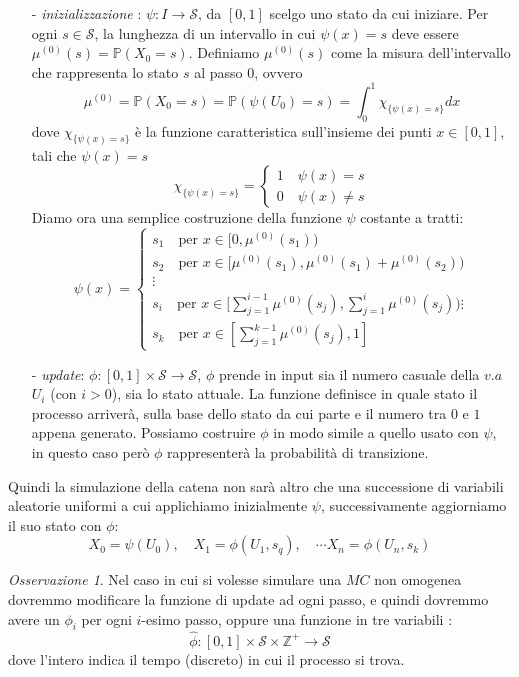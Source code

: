 \documentclass{article}
\theoremstyle{definition}
\theoremstyle{definition}
\theoremstyle{remark}
\newtheorem{remark}[theorem]{Osservazione}
\begin{document}
\begin{itemize}
    \item[-] \textit{inizializzazione} : $\psi : I\to \mathcal{S}$, da $[0,1]$ scelgo uno stato da cui iniziare.
          Per ogni $s\in\mathcal{S}$, la lunghezza di un intervallo in cui $\psi(x)=s$ deve essere $\mu^{(0)}(s) =\mathbb{P}(X_0 = s) $.
          Definiamo $\mu^{(0)}(s)$ come la misura dell'intervallo che rappresenta lo stato $s$ al passo $0$, ovvero
          $$ \mu^{(0)} = \mathbb{P}(X_0 = s) = \mathbb{P}(\psi(U_0)=s) = \int_0^1 \chi_{\{\psi(x)=s\}} dx$$
          dove $\chi_{\{\psi(x) = s\}}$ è la funzione caratteristica sull'insieme dei punti  $x\in [0,1]$, tali che $\psi(x) = s$
          $$\chi_{\{\psi(x) = s\}} =\left\{ \begin{array}{cl} 1 \quad \psi(x) = s\\ 0 \quad \psi(x) \neq s\end{array} \right.$$
          Diamo ora una semplice costruzione della funzione $\psi$ costante a tratti:
          $$\psi(x)= \begin{cases}

                  s_1 \quad \text{per $x\in [0,\mu^{(0)}(s_1))$}                             \\
                  s_2 \quad \text{per $x\in [\mu^{(0)}(s_1),\mu^{(0)}(s_1)+\mu^{(0)}(s_2))$} \\
                  \vdots                                                                     \\
                  s_i \quad \text{per $x \in [\sum_{j=1}^{i-1}\mu^{(0)}(s_j),\sum_{j=1}^i\mu^{(0)}(s_j))$}
                  \vdots                                                                     \\
                  s_k \quad \text{per $x\in[\sum_{j=1}^{k-1}\mu^{(0)}(s_j),1]$}
              \end{cases}$$
    \item[-]\textit{update}: $\phi : [0,1]\times\mathcal{S}\to \mathcal{S} $, $\phi$ prende in input sia il numero casuale della $v.a$ $U_i$ (con $i>0$), sia  lo stato attuale.
          La funzione definisce in quale stato il processo arriverà, sulla base dello stato da cui parte e il numero tra $0$ e $1$ appena generato. Possiamo costruire $\phi$ in modo simile
          a quello usato con $\psi$, in questo caso però $\phi$ rappresenterà la probabilità di transizione.
\end{itemize}
Quindi la simulazione della catena non sarà altro che una successione di variabili aleatorie uniformi a cui applichiamo inizialmente $\psi$, successivamente aggiorniamo
il suo stato con $\phi$:
$$X_0 = \psi(U_0),\quad X_1 = \phi(U_1,s_q),\quad  \cdots X_n = \phi(U_n,s_k)$$
\begin{remark}
    Nel caso in cui si volesse simulare una $MC$ non omogenea  dovremmo modificare la funzione di update ad ogni passo, e quindi dovremmo avere un $\phi_i$ per ogni $i$-esimo passo, oppure  una funzione in tre variabili :
    $$\widehat{\phi}:[0,1]\times\mathcal{S}\times \mathbb{Z}^+\to \mathcal{S}$$
    dove l'intero indica il tempo (discreto) in cui il processo si trova.
\end{remark}
\end{document}

